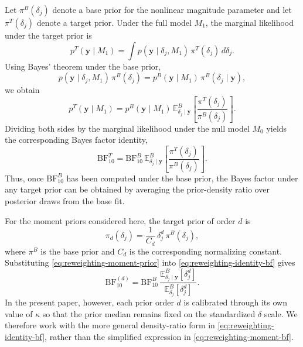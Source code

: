 \documentclass{article}
\begin{document}
Let $\pi^{B}(\delta_j)$ denote a base prior for the nonlinear magnitude
parameter and let $\pi^{T}(\delta_j)$ denote a target prior. Under the
full model $M_1$, the marginal likelihood under the target prior is
%
\begin{equation}
\label{eq:reweighting-marginal}
p^{T}(\mathbf{y}\mid M_1)
  = \int p(\mathbf{y}\mid \delta_j, M_1)\,\pi^{T}(\delta_j)\,d\delta_j.
\end{equation}
%
Using Bayes' theorem under the base prior,
%
\begin{equation}
p(\mathbf{y}\mid \delta_j, M_1)\,\pi^{B}(\delta_j)
  = p^{B}(\mathbf{y}\mid M_1)\,\pi^{B}(\delta_j\mid \mathbf{y}),
\end{equation}
%
we obtain
%
\begin{equation}
\label{eq:reweighting-identity-ml}
p^{T}(\mathbf{y}\mid M_1)
  = p^{B}(\mathbf{y}\mid M_1)\,
    \mathbb{E}^{B}_{\delta_j\mid \mathbf{y}}
    \left[
      \frac{\pi^{T}(\delta_j)}{\pi^{B}(\delta_j)}
    \right].
\end{equation}
%
Dividing both sides by the marginal likelihood under the null model
$M_0$ yields the corresponding Bayes factor identity,
%
\begin{equation}
\label{eq:reweighting-identity-bf}
\mathrm{BF}^{T}_{10}
  = \mathrm{BF}^{B}_{10}\,
    \mathbb{E}^{B}_{\delta_j\mid \mathbf{y}}
    \left[
      \frac{\pi^{T}(\delta_j)}{\pi^{B}(\delta_j)}
    \right].
\end{equation}
%
Thus, once $\mathrm{BF}^{B}_{10}$ has been computed under the base prior,
the Bayes factor under any target prior can be obtained by averaging the
prior-density ratio over posterior draws from the base fit.

For the moment priors considered here, the target prior of order $d$ is
%
\begin{equation}
\label{eq:reweighting-moment-prior}
\pi_d(\delta_j)
  = \frac{1}{C_d}\,\delta_j^d\,\pi^{B}(\delta_j),
\end{equation}
%
where $\pi^{B}$ is the base prior and $C_d$ is the corresponding
normalizing constant. Substituting \eqref{eq:reweighting-moment-prior}
into \eqref{eq:reweighting-identity-bf} gives
%
\begin{equation}
\label{eq:reweighting-moment-bf}
\mathrm{BF}^{(d)}_{10}
  = \mathrm{BF}^{B}_{10}\,
    \frac{\mathbb{E}^{B}_{\delta_j\mid \mathbf{y}}[\delta_j^d]}
         {\mathbb{E}^{B}_{\delta_j}[\delta_j^d]}.
\end{equation}
%
In the present paper, however, each prior order $d$ is calibrated through
its own value of $\kappa$ so that the prior median remains fixed on the
standardized $\delta$ scale. We therefore work with the more general
density-ratio form in \eqref{eq:reweighting-identity-bf}, rather than the
simplified expression in \eqref{eq:reweighting-moment-bf}.
\end{document}
